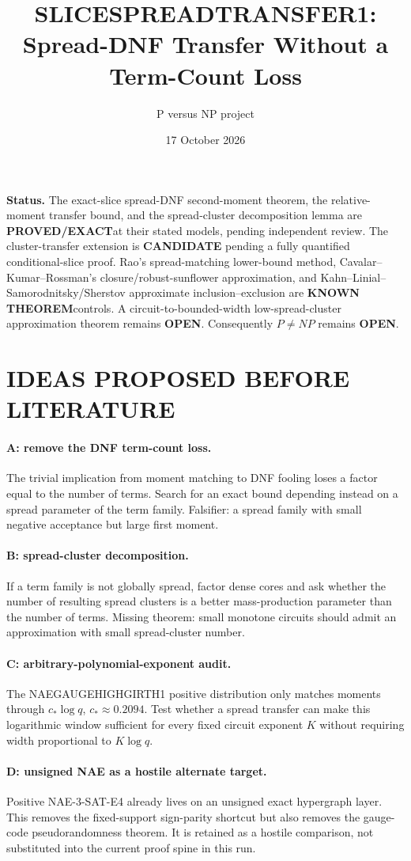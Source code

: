 \documentclass[11pt]{article}
\title{SLICESPREADTRANSFER1: Spread-DNF Transfer Without a Term-Count Loss}
\author{P versus NP project}
\date{17 October 2026}
\newcommand{\EXACT}{\textbf{PROVED/EXACT}}
\newcommand{\KNOWN}{\textbf{KNOWN THEOREM}}
\newcommand{\OPEN}{\textbf{OPEN}}
\begin{document}
\maketitle

\noindent\textbf{Status.} The exact-slice spread-DNF second-moment theorem, the relative-moment transfer bound, and the spread-cluster decomposition lemma are \EXACT at their stated models, pending independent review. The cluster-transfer extension is \textbf{CANDIDATE} pending a fully quantified conditional-slice proof. Rao's spread-matching lower-bound method, Cavalar--Kumar--Rossman's closure/robust-sunflower approximation, and Kahn--Linial--Samorodnitsky/Sherstov approximate inclusion--exclusion are \KNOWN controls. A circuit-to-bounded-width low-spread-cluster approximation theorem remains \OPEN. Consequently $P\ne NP$ remains \OPEN.

\section{IDEAS PROPOSED BEFORE LITERATURE}
\paragraph{A: remove the DNF term-count loss.} The trivial implication from moment matching to DNF fooling loses a factor equal to the number of terms. Search for an exact bound depending instead on a spread parameter of the term family. Falsifier: a spread family with small negative acceptance but large first moment.
\paragraph{B: spread-cluster decomposition.} If a term family is not globally spread, factor dense cores and ask whether the number of resulting spread clusters is a better mass-production parameter than the number of terms. Missing theorem: small monotone circuits should admit an approximation with small spread-cluster number.
\paragraph{C: arbitrary-polynomial-exponent audit.} The NAEGAUGEHIGHGIRTH1 positive distribution only matches moments through $c_*\log q$, $c_*\approx0.2094$. Test whether a spread transfer can make this logarithmic window sufficient for every fixed circuit exponent $K$ without requiring width proportional to $K\log q$.
\paragraph{D: unsigned NAE as a hostile alternate target.} Positive NAE-3-SAT-E4 already lives on an unsigned exact hypergraph layer. This removes the fixed-support sign-parity shortcut but also removes the gauge-code pseudorandomness theorem. It is retained as a hostile comparison, not substituted into the current proof spine in this run.
\end{document}
